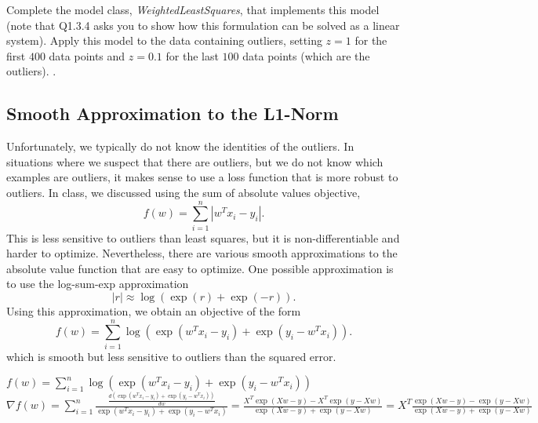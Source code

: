\documentclass{article}
\begin{document}
Complete the model class, \emph{WeightedLeastSquares}, that implements this model 
(note that Q1.3.4 asks you to show how this formulation can be solved as a linear system).
Apply this model to the data containing outliers, setting $z = 1$ for the first 
$400$ data points and $z = 0.1$ for the last $100$ data points (which are the outliers). 
.


\subsection{Smooth Approximation to the L1-Norm}

Unfortunately, we typically do not know the identities of the outliers. In situations where we suspect that there are outliers, but we do not know which examples are outliers, it makes sense to use a loss function that is more robust to outliers. In class, we discussed using the sum of absolute values objective,
\[
f(w) = \sum_{i=1}^n |w^Tx_i - y_i|.
\]
This is less sensitive to outliers than least squares, but it is non-differentiable and harder to optimize. Nevertheless, there are various smooth approximations to the absolute value function that are easy to optimize. One possible approximation is to use the log-sum-exp approximation
\[
|r| \approx \log(\exp(r) + \exp(-r)).
\]
Using this approximation, we obtain an objective of the form
\[
f(w) {=} \sum_{i=1}^n  \log\left(\exp(w^Tx_i - y_i) + \exp(y_i - w^Tx_i)\right).
\]
which is smooth but less sensitive to outliers than the squared error. 
 
$f(w) = \sum_{i=1}^n  \log\left(\exp(w^Tx_i - y_i) + \exp(y_i - w^Tx_i)\right)$
\newline 
\newline $\nabla f(w) = \sum_{i=1}^n\frac{\frac{d(\exp(w^Tx_i - y_i) + \exp(y_i - w^Tx_i))}{dw}}{\exp(w^Tx_i - y_i) + \exp(y_i - w^Tx_i)}=\frac{X^T\exp(Xw-y) -X^T \exp(y-Xw)}{\exp(Xw - y) + \exp(y-Xw)}=X^T\frac{\exp(Xw-y) - \exp(y-Xw)}{\exp(Xw - y) + \exp(y-Xw)}$
\end{document}
